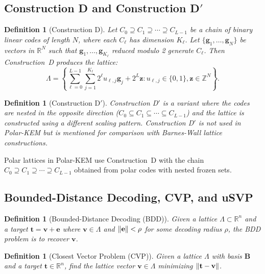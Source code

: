 \documentclass[11pt,a4paper]{article}
\newtheorem{definition}[theorem]{Definition}
\newcommand{\polarKem}{\textsf{Polar-KEM}\xspace}
\newcommand{\BDD}{\textsf{BDD}\xspace}
\newcommand{\CVP}{\textsf{CVP}\xspace}
\newcommand{\Z}{\mathbb{Z}}
\newcommand{\R}{\mathbb{R}}
\DeclarePairedDelimiter{\norm}{\lVert}{\rVert}
\begin{document}
\subsection{Construction D and Construction D$'$}\label{sec:construction-d}

\begin{definition}[Construction D]\label{def:construction-d}
Let $C_0 \supseteq C_1 \supseteq \cdots \supseteq C_{L-1}$ be a chain of binary linear codes of length $N$, where each $C_\ell$ has dimension $K_\ell$. Let $\{\mathbf{g}_1, \ldots, \mathbf{g}_N\}$ be vectors in $\R^N$ such that $\mathbf{g}_1, \ldots, \mathbf{g}_{K_\ell}$ reduced modulo 2 generate $C_\ell$. Then Construction~D produces the lattice:
\[
\Lambda = \left\{ \sum_{\ell=0}^{L-1} \sum_{j=1}^{K_\ell} 2^\ell u_{\ell,j} \mathbf{g}_j + 2^L \mathbf{z} : u_{\ell,j} \in \{0,1\}, \mathbf{z} \in \Z^N \right\}.
\]
\end{definition}

\begin{definition}[Construction D$'$]\label{def:construction-d-prime}
Construction D$'$ is a variant where the codes are nested in the opposite direction ($C_0 \subseteq C_1 \subseteq \cdots \subseteq C_{L-1}$) and the lattice is constructed using a different scaling pattern. Construction D$'$ is not used in \polarKem but is mentioned for comparison with Barnes-Wall lattice constructions.
\end{definition}

Polar lattices in \polarKem use Construction~D with the chain $C_0 \supseteq C_1 \supseteq \cdots \supseteq C_{L-1}$ obtained from polar codes with nested frozen sets.

\subsection{Bounded-Distance Decoding, CVP, and uSVP}\label{sec:bdd}

\begin{definition}[Bounded-Distance Decoding (\BDD)]\label{def:bdd}
Given a lattice $\Lambda \subset \R^n$ and a target $\mathbf{t} = \mathbf{v} + \mathbf{e}$ where $\mathbf{v} \in \Lambda$ and $\norm{\mathbf{e}} < \rho$ for some decoding radius $\rho$, the \BDD problem is to recover $\mathbf{v}$.
\end{definition}

\begin{definition}[Closest Vector Problem (\CVP)]\label{def:cvp}
Given a lattice $\Lambda$ with basis $\mathbf{B}$ and a target $\mathbf{t} \in \R^n$, find the lattice vector $\mathbf{v} \in \Lambda$ minimizing $\norm{\mathbf{t} - \mathbf{v}}$.
\end{definition}
\end{document}
